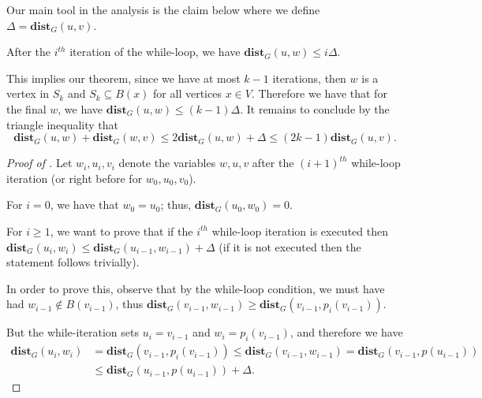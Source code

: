 Our main tool in the analysis is the claim below where we define $\Delta = \mathbf{dist}_G(u,v)$. 

\begin{claim}\label{claim:DistanceOracleSwapping} After the $i^{th}$ iteration of the while-loop, we have $\mathbf{dist}_G(u,w) \leq i\Delta$.
\end{claim}

This implies our theorem, since we have at most $k-1$ iterations, then $w$ is a vertex in $S_k$ and $S_k \subseteq B(x)$ for all vertices $x \in V$. Therefore we have that for the final $w$, we have $\mathbf{dist}_G(u,w) \leq (k-1)\Delta$. It remains to conclude by the triangle inequality that 
\[
\mathbf{dist}_G(u,w) + \mathbf{dist}_G(w,v) \leq 2\mathbf{dist}_G(u,w) + \Delta \leq (2k-1)\mathbf{dist}_G(u,v).
\]

\begin{proof}[Proof of ]
Let $w_i, u_i, v_i$ denote the variables $w,u,v$ after the $(i+1)^{th}$ while-loop iteration (or right before for $w_0,u_0,v_0$).

For $i = 0$, we have that $w_0 = u_0$; thus, $\mathbf{dist}_G(u_0,w_0) = 0$.

For $i \geq 1$, we want to prove that if the $i^{th}$ while-loop iteration is executed then $\mathbf{dist}_G(u_i,w_i) \leq \mathbf{dist}_G(u_{i-1},w_{i-1}) + \Delta$ (if it is not executed then the statement follows trivially).

In order to prove this, observe that by the while-loop condition, we must have had $w_{i-1} \not\in B(v_{i-1})$, thus  $\mathbf{dist}_G(v_{i-1}, w_{i-1}) \geq \mathbf{dist}_G(v_{i-1}, p_i(v_{i-1}))$.

But the while-iteration sets $u_i = v_{i-1}$ and $w_i = p_i(v_{i-1})$, and therefore we have
\begin{align*}
\mathbf{dist}_G(u_{i}, w_i) &= \mathbf{dist}_G(v_{i-1}, p_i(v_{i-1})) \leq
\mathbf{dist}_G(v_{i-1}, w_{i-1}) = \mathbf{dist}_G(v_{i-1}, p(u_{i-1})) \\&\leq \mathbf{dist}_G(u_{i-1}, p(u_{i-1})) + \Delta.
\end{align*}
\end{proof}